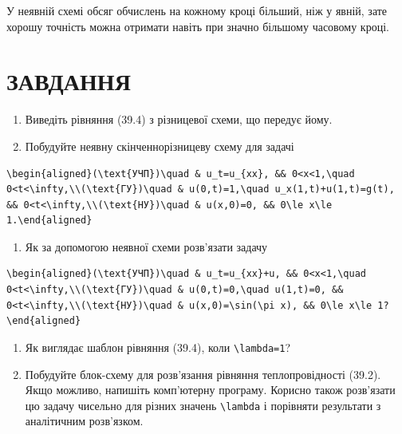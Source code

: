 \documentclass[
  ukrainian,
]{article}
\providecommand{\tightlist}{%
  \setlength{\itemsep}{0pt}\setlength{\parskip}{0pt}}
\begin{document}
У неявній схемі обсяг обчислень на кожному кроці більший, ніж у явній,
зате хорошу точність можна отримати навіть при значно більшому часовому
кроці.

\section{ЗАВДАННЯ}\label{ux437ux430ux432ux434ux430ux43dux43dux44f-10}

\begin{enumerate}
\def\labelenumi{\arabic{enumi}.}
\item
  Виведіть рівняння (39.4) з різницевої схеми, що передує йому.
\item
  Побудуйте неявну скінченнорізницеву схему для задачі
\end{enumerate}

\begin{verbatim}
\begin{aligned}(\text{УЧП})\quad & u_t=u_{xx}, && 0<x<1,\quad 0<t<\infty,\\(\text{ГУ})\quad & u(0,t)=1,\quad u_x(1,t)+u(1,t)=g(t), && 0<t<\infty,\\(\text{НУ})\quad & u(x,0)=0, && 0\le x\le 1.\end{aligned}
\end{verbatim}

\begin{enumerate}
\def\labelenumi{\arabic{enumi}.}
\setcounter{enumi}{2}
\tightlist
\item
  Як за допомогою неявної схеми розв'язати задачу
\end{enumerate}

\begin{verbatim}
\begin{aligned}(\text{УЧП})\quad & u_t=u_{xx}+u, && 0<x<1,\quad 0<t<\infty,\\(\text{ГУ})\quad & u(0,t)=0,\quad u(1,t)=0, && 0<t<\infty,\\(\text{НУ})\quad & u(x,0)=\sin(\pi x), && 0\le x\le 1?\end{aligned}
\end{verbatim}

\begin{enumerate}
\def\labelenumi{\arabic{enumi}.}
\setcounter{enumi}{3}
\item
  Як виглядає шаблон рівняння (39.4), коли
  \texttt{\textbackslash{}lambda=1}?
\item
  Побудуйте блок-схему для розв'язання рівняння теплопровідності (39.2).
  Якщо можливо, напишіть комп'ютерну програму. Корисно також розв'язати
  цю задачу чисельно для різних значень \texttt{\textbackslash{}lambda}
  і порівняти результати з аналітичним розв'язком.
\end{enumerate}
\end{document}
